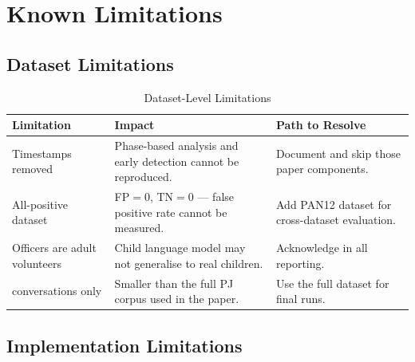 \documentclass[12pt,a4paper]{article}
\begin{document}
\section{Known Limitations}

\subsection{Dataset Limitations}

\begin{table}[H]
  \centering
  \caption{Dataset-Level Limitations}
  \begin{tabularx}{\linewidth}{>{\raggedright}p{3.8cm}
                               >{\raggedright}p{4cm}
                               X}
    \toprule
    \textbf{Limitation} & \textbf{Impact} & \textbf{Path to Resolve} \\
    \midrule
    Timestamps removed &
      Phase-based analysis and early detection cannot be reproduced. &
      Document and skip those paper components. \\
    \addlinespace
    All-positive dataset &
      FP$=0$, TN$=0$ --- false positive rate cannot be measured. &
      Add PAN12 dataset for cross-dataset evaluation. \\
    \addlinespace
    Officers are adult volunteers &
      Child language model may not generalise to real children. &
      Acknowledge in all reporting. \\
    \addlinespace
    622 conversations only &
      Smaller than the full PJ corpus used in the paper. &
      Use the full dataset for final runs. \\
    \bottomrule
  \end{tabularx}
  \label{tab:dataset_limits}
\end{table}

\subsection{Implementation Limitations}
\end{document}
